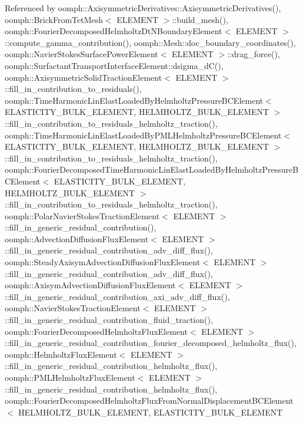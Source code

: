 Referenced by oomph\+::\+Axisymmetric\+Derivatives\+::\+Axisymmetric\+Derivatives(), oomph\+::\+Brick\+From\+Tet\+Mesh$<$ E\+L\+E\+M\+E\+N\+T $>$\+::build\+\_\+mesh(), oomph\+::\+Fourier\+Decomposed\+Helmholtz\+Dt\+N\+Boundary\+Element$<$ E\+L\+E\+M\+E\+N\+T $>$\+::compute\+\_\+gamma\+\_\+contribution(), oomph\+::\+Mesh\+::doc\+\_\+boundary\+\_\+coordinates(), oomph\+::\+Navier\+Stokes\+Surface\+Power\+Element$<$ E\+L\+E\+M\+E\+N\+T $>$\+::drag\+\_\+force(), oomph\+::\+Surfactant\+Transport\+Interface\+Element\+::dsigma\+\_\+d\+C(), oomph\+::\+Axisymmetric\+Solid\+Traction\+Element$<$ E\+L\+E\+M\+E\+N\+T $>$\+::fill\+\_\+in\+\_\+contribution\+\_\+to\+\_\+residuals(), oomph\+::\+Time\+Harmonic\+Lin\+Elast\+Loaded\+By\+Helmholtz\+Pressure\+B\+C\+Element$<$ E\+L\+A\+S\+T\+I\+C\+I\+T\+Y\+\_\+\+B\+U\+L\+K\+\_\+\+E\+L\+E\+M\+E\+N\+T, H\+E\+L\+M\+H\+O\+L\+T\+Z\+\_\+\+B\+U\+L\+K\+\_\+\+E\+L\+E\+M\+E\+N\+T $>$\+::fill\+\_\+in\+\_\+contribution\+\_\+to\+\_\+residuals\+\_\+helmholtz\+\_\+traction(), oomph\+::\+Time\+Harmonic\+Lin\+Elast\+Loaded\+By\+P\+M\+L\+Helmholtz\+Pressure\+B\+C\+Element$<$ E\+L\+A\+S\+T\+I\+C\+I\+T\+Y\+\_\+\+B\+U\+L\+K\+\_\+\+E\+L\+E\+M\+E\+N\+T, H\+E\+L\+M\+H\+O\+L\+T\+Z\+\_\+\+B\+U\+L\+K\+\_\+\+E\+L\+E\+M\+E\+N\+T $>$\+::fill\+\_\+in\+\_\+contribution\+\_\+to\+\_\+residuals\+\_\+helmholtz\+\_\+traction(), oomph\+::\+Fourier\+Decomposed\+Time\+Harmonic\+Lin\+Elast\+Loaded\+By\+Helmholtz\+Pressure\+B\+C\+Element$<$ E\+L\+A\+S\+T\+I\+C\+I\+T\+Y\+\_\+\+B\+U\+L\+K\+\_\+\+E\+L\+E\+M\+E\+N\+T, H\+E\+L\+M\+H\+O\+L\+T\+Z\+\_\+\+B\+U\+L\+K\+\_\+\+E\+L\+E\+M\+E\+N\+T $>$\+::fill\+\_\+in\+\_\+contribution\+\_\+to\+\_\+residuals\+\_\+helmholtz\+\_\+traction(), oomph\+::\+Polar\+Navier\+Stokes\+Traction\+Element$<$ E\+L\+E\+M\+E\+N\+T $>$\+::fill\+\_\+in\+\_\+generic\+\_\+residual\+\_\+contribution(), oomph\+::\+Advection\+Diffusion\+Flux\+Element$<$ E\+L\+E\+M\+E\+N\+T $>$\+::fill\+\_\+in\+\_\+generic\+\_\+residual\+\_\+contribution\+\_\+adv\+\_\+diff\+\_\+flux(), oomph\+::\+Steady\+Axisym\+Advection\+Diffusion\+Flux\+Element$<$ E\+L\+E\+M\+E\+N\+T $>$\+::fill\+\_\+in\+\_\+generic\+\_\+residual\+\_\+contribution\+\_\+adv\+\_\+diff\+\_\+flux(), oomph\+::\+Axisym\+Advection\+Diffusion\+Flux\+Element$<$ E\+L\+E\+M\+E\+N\+T $>$\+::fill\+\_\+in\+\_\+generic\+\_\+residual\+\_\+contribution\+\_\+axi\+\_\+adv\+\_\+diff\+\_\+flux(), oomph\+::\+Navier\+Stokes\+Traction\+Element$<$ E\+L\+E\+M\+E\+N\+T $>$\+::fill\+\_\+in\+\_\+generic\+\_\+residual\+\_\+contribution\+\_\+fluid\+\_\+traction(), oomph\+::\+Fourier\+Decomposed\+Helmholtz\+Flux\+Element$<$ E\+L\+E\+M\+E\+N\+T $>$\+::fill\+\_\+in\+\_\+generic\+\_\+residual\+\_\+contribution\+\_\+fourier\+\_\+decomposed\+\_\+helmholtz\+\_\+flux(), oomph\+::\+Helmholtz\+Flux\+Element$<$ E\+L\+E\+M\+E\+N\+T $>$\+::fill\+\_\+in\+\_\+generic\+\_\+residual\+\_\+contribution\+\_\+helmholtz\+\_\+flux(), oomph\+::\+P\+M\+L\+Helmholtz\+Flux\+Element$<$ E\+L\+E\+M\+E\+N\+T $>$\+::fill\+\_\+in\+\_\+generic\+\_\+residual\+\_\+contribution\+\_\+helmholtz\+\_\+flux(), oomph\+::\+Fourier\+Decomposed\+Helmholtz\+Flux\+From\+Normal\+Displacement\+B\+C\+Element$<$ H\+E\+L\+M\+H\+O\+L\+T\+Z\+\_\+\+B\+U\+L\+K\+\_\+\+E\+L\+E\+M\+E\+N\+T, E\+L\+A\+S\+T\+I\+C\+I\+T\+Y\+\_\+\+B\+U\+L\+K\+\_\+\+E\+L\+E\+M\+E\+N\+T 